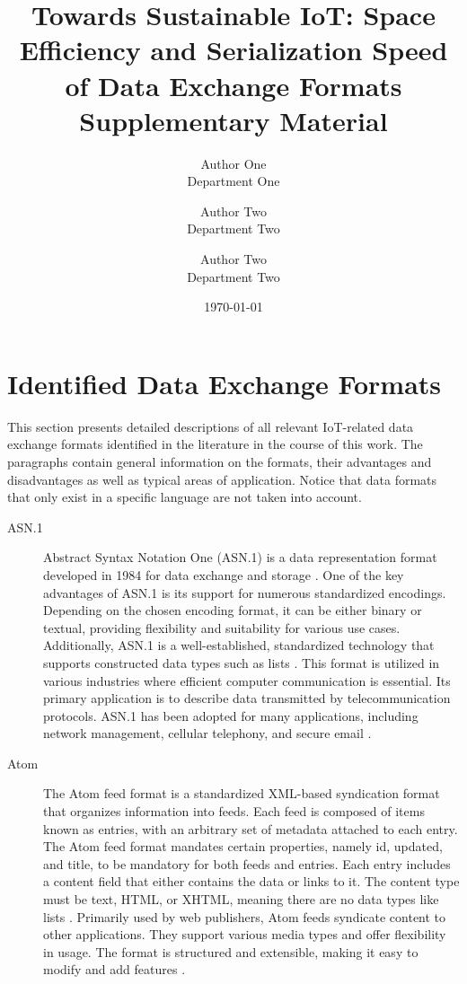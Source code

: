 \documentclass[10pt]{IEEEtran}
\title{
Towards Sustainable IoT: Space Efficiency and Serialization Speed of Data Exchange Formats\\[2ex]
\huge \textbf{Supplementary Material} 
}
\date{\today}
\author{Author One\\ Department One\\
\and Author Two\\ Department Two\\
\and Author Two\\ Department Two}
\begin{document}
\maketitle

\section{Identified Data Exchange Formats}
This section presents detailed descriptions of all relevant IoT-related data exchange formats identified in the literature in the course of this work.
The paragraphs contain general information on the formats, their advantages and disadvantages as well as typical areas of application.
Notice that data formats that only exist in a specific language are not taken into account.


\begin{description}
    \item[ASN.1]  Abstract Syntax Notation One (ASN.1) is a data representation format developed in 1984 for data exchange and storage \cite{itu_2024}. One of the key advantages of ASN.1 is its support for numerous standardized encodings. Depending on the chosen encoding format, it can be either binary or textual, providing flexibility and suitability for various use cases. Additionally, ASN.1 is a well-established, standardized technology that supports constructed data types such as lists \cite{viotti_2022}. This format is utilized in various industries where efficient computer communication is essential. Its primary application is to describe data transmitted by telecommunication protocols. ASN.1 has been adopted for many applications, including network management, cellular telephony, and secure email \cite{itu_2024}.
    \item[Atom] The Atom feed format is a standardized XML-based syndication format that organizes information into feeds. Each feed is composed of items known as entries, with an arbitrary set of metadata attached to each entry. The Atom feed format mandates certain properties, namely id, updated, and title, to be mandatory for both feeds and entries. Each entry includes a content field that either contains the data or links to it. The content type must be text, HTML, or XHTML, meaning there are no data types like lists \cite{nottingham_2005}. Primarily used by web publishers, Atom feeds syndicate content to other applications. They support various media types and offer flexibility in usage. The format is structured and extensible, making it easy to modify and add features \cite{fastercapital_2024}.

\end{description}
\end{document}
